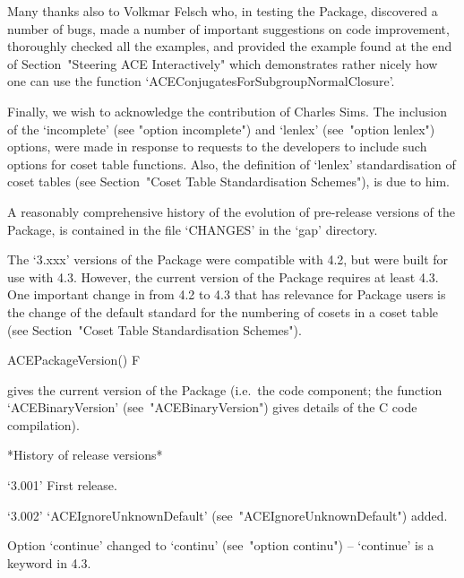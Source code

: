 Many thanks also to Volkmar Felsch who, in testing the {\ACE} Package,
discovered a number of bugs, made a number of important suggestions on
code improvement, thoroughly checked all the  examples,  and  provided
the example found at the end of Section~"Steering  ACE  Interactively"
which  demonstrates  rather  nicely  how  one  can  use  the  function
`ACEConjugatesForSubgroupNormalClosure'.

Finally, we wish to acknowledge the contribution of Charles Sims.  The
inclusion of the `incomplete' (see "option incomplete")  and  `lenlex'
(see~"option lenlex") options, were made in response  to  requests  to
the  {\GAP}  developers  to  include  such  options  for  coset  table
functions. Also, the definition of `lenlex' standardisation  of  coset
tables (see Section~"Coset Table Standardisation Schemes"), is due  to
him.


A reasonably comprehensive history of  the  evolution  of  pre-release
versions of the {\ACE} Package, is contained in the file `CHANGES'  in
the `gap' directory. 

The `3.xxx' versions of the {\ACE} Package were compatible with {\GAP}
4.2, but were built for use with  {\GAP}  4.3.  However,  the  current
version of the {\ACE}  Package  requires  at  least  {\GAP}  4.3.  One
important change in {\GAP} from {\GAP} 4.2  to  {\GAP}  4.3  that  has
relevance for {\ACE} Package  users  is  the  change  of  the  default
standard  for  the  numbering  of  cosets  in  a  coset   table   (see
Section~"Coset Table Standardisation Schemes").

\>ACEPackageVersion() F

gives the current version of the {\ACE} Package (i.e.~the {\GAP}  code
component; the  function  `ACEBinaryVersion'  (see~"ACEBinaryVersion")
gives details of the C code compilation).

*History of release versions*

\beginlist

\item{`3.001'}
First release.

\item{`3.002'}
`ACEIgnoreUnknownDefault' (see~"ACEIgnoreUnknownDefault")  added.

\item{}
Option `continue'  changed  to  `continu'  (see~"option  continu")  --
`continue' is a keyword in {\GAP} 4.3.

